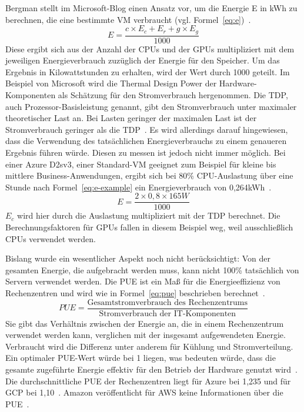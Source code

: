 Bergman stellt im Microsoft-Blog einen Ansatz vor, um die Energie E in kWh zu berechnen, die eine bestimmte \ac{VM} verbraucht (vgl. Formel~\ref{eq:e})~\cite{Bergman.15.2.2021}.
\begin{equation}
 \label{eq:e}
 E = \frac{c \times E_c + E_r + g \times E_g}{1000}
\end{equation}
Diese ergibt sich aus der Anzahl der \acp{CPU} und der \acp{GPU} multipliziert mit dem jeweiligen Energieverbrauch zuzüglich der Energie für den Speicher.
Um das Ergebnis in Kilowattstunden zu erhalten, wird der Wert durch 1000 geteilt.
Im Beispiel von Microsoft wird die Thermal Design Power der Hardware-Komponenten als Schätzung für den Stromverbrauch hergenommen.
Die \ac{TDP}, auch Prozessor-Basisleistung genannt, gibt den Stromverbrauch unter maximaler theoretischer Last an.
Bei Lasten geringer der maximalen Last ist der Stromverbrauch geringer als die \ac{TDP}~\cite{Intel.20240317}.
Es wird allerdings darauf hingewiesen, dass die Verwendung des tatsächlichen Energieverbrauchs zu einem genaueren Ergebnis führen würde.
Diesen zu messen ist jedoch nicht immer möglich.
Bei einer Azure D2sv3, einer Standard-\ac{VM} geeignet zum Beispiel für kleine bis mittlere Business-Anwendungen, ergibt sich bei 80\% \ac{CPU}-Auslastung über eine Stunde nach Formel~\ref{eq:e-example} ein Energieverbrauch von 0,264kWh~\cite{Bergman.15.2.2021}.
\begin{equation}
 \label{eq:e-example}
 E = \frac{2 \times 0,8 \times 165W}{1000}
\end{equation}
$E_c$ wird hier durch die Auslastung multipliziert mit der \ac{TDP} berechnet.
Die Berechnungsfaktoren für \acp{GPU} fallen in diesem Beispiel weg, weil ausschließlich \acp{CPU} verwendet werden.

Bislang wurde ein wesentlicher Aspekt noch nicht berücksichtigt:
Von der gesamten Energie, die aufgebracht werden muss, kann nicht 100\% tatsächlich von Servern verwendet werden.
Die \ac{PUE} ist ein Maß für die Energieeffizienz von Rechenzentren und wird wie in Formel~\ref{eq:pue} beschrieben berechnet~\cite{Walsh.22.4.2022}.
\begin{equation}
 \label{eq:pue}
 PUE = \frac{\text{Gesamtstromverbrauch des Rechenzentrums}}{\text{Stromverbrauch der IT-Komponenten}}
\end{equation}
Sie gibt das Verhältnis zwischen der Energie an, die in einem Rechenzentrum verwendet werden kann, verglichen mit der insgesamt aufgewendeten Energie.
Verbraucht wird die Differenz unter anderem für Kühlung und Stromverteilung.
Ein optimaler \ac{PUE}-Wert würde bei 1 liegen, was bedeuten würde, dass die gesamte zugeführte Energie effektiv für den Betrieb der Hardware genutzt wird~\cite{GreenSoftwareFoundation.2022}.
Die durchschnittliche \ac{PUE} der Rechenzentren liegt für Azure bei 1,235 und für \ac{GCP} bei 1,10~\cite{Walsh.22.4.2022}\cite{Google.20240312}.
Amazon veröffentlicht für \ac{AWS} keine Informationen über die \ac{PUE}~\cite{Cockcroft.18.7.2023}.

